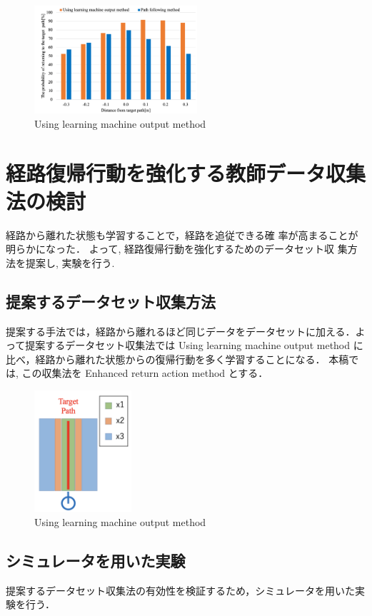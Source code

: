 \documentclass{jarticle}
\begin{document}
\begin{figure}[h!]
  \centering
   \includegraphics[height=40mm]{./figs/path.png}
   \caption{Using learning machine output method}
\end{figure}



\section{経路復帰行動を強化する教師データ収集法の検討}

経路から離れた状態も学習することで，経路を追従できる確
率が高まることが明らかになった． よって, 経路復帰行動を強化するためのデータセット収
集方法を提案し, 実験を行う.

\subsection{提案するデータセット収集方法}
提案する手法では，経路から離れるほど同じデータをデータセットに加える．よって提案するデータセット収集法では 
Using learning machine output method に比べ，経路から離れた状態からの復帰行動を多く学習することになる．
本稿では, この収集法を Enhanced return action method とする．

\begin{figure}[h!]\vspace*{-3mm}
  \centering
   \includegraphics[height=45mm]{./figs/method.png}
   \caption{Using learning machine output method}
\end{figure}


\subsection{シミュレータを用いた実験}
提案するデータセット収集法の有効性を検証するため，シミュレータを用いた実験を行う．
\end{document}
